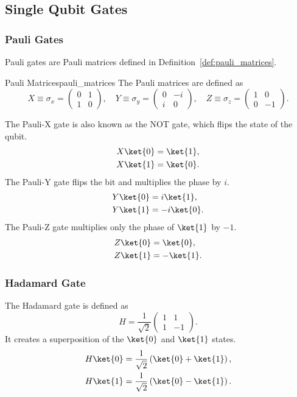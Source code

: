 \subsection{Single Qubit Gates}
\subsubsection{Pauli Gates}
Pauli gates are Pauli matrices defined in Definition~\ref{def:pauli_matrices}.
\begin{definition}{Pauli Matrices}{pauli_matrices}
    The Pauli matrices are defined as
\begin{equation}
	X \equiv \sigma_x = \begin{pmatrix}
		0 & 1 \\
		1 & 0
	\end{pmatrix}, \quad
	Y \equiv \sigma_y = \begin{pmatrix}
		0 & -i \\
		i & 0
	\end{pmatrix}, \quad
	Z \equiv \sigma_z = \begin{pmatrix}
		1 & 0 \\
		0 & -1
	\end{pmatrix}.
\end{equation}
\end{definition}

The Pauli-X gate is also known as the NOT gate, which flips the state of the qubit.
\begin{align}
	X\ket{0} &= \ket{1}, \\
	X\ket{1} &= \ket{0}.	
\end{align}
The Pauli-Y gate flips the bit and multiplies the phase by $ i $. 
\begin{align}
	Y\ket{0} &= i\ket{1}, \\
	Y\ket{1} &= -i\ket{0}.
\end{align}
The Pauli-Z gate multiplies only the phase of $\ket{1}$ by $ -1 $.
\begin{align}
	Z\ket{0} &= \ket{0}, \\
	Z\ket{1} &= -\ket{1}.
\end{align}

\subsubsection{Hadamard Gate}
The Hadamard gate is defined as
\begin{equation}
	H = \frac{1}{\sqrt{2}} \begin{pmatrix}
		1 & 1 \\
		1 & -1
	\end{pmatrix}.
\end{equation}
It creates a superposition of the $ \ket{0} $ and $ \ket{1} $ states.
\begin{align}
	H\ket{0} &= \frac{1}{\sqrt{2}} \left( \ket{0} + \ket{1} \right), \\
	H\ket{1} &= \frac{1}{\sqrt{2}} \left( \ket{0} - \ket{1} \right).
\end{align}

